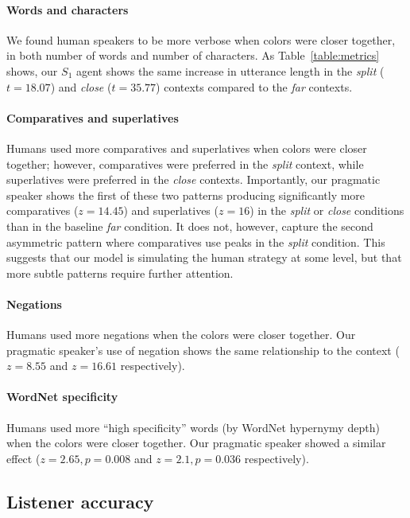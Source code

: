 \documentclass[11pt,letterpaper]{article}
\newcommand{\Speaker}{S}
\renewcommand{\|}{\mid}
\newcommand{\tabref}[1]{Table~\ref{#1}}
\newcommand{\cond}{\emph}
\begin{document}
\paragraph{Words and characters} We found human speakers to be more verbose when
colors were closer together, in both number of words and number of characters.
As \tabref{table:metrics} shows, our $\Speaker_{1}$  agent
shows the same increase in utterance length in the \cond{split} ($t = 18.07$) and \cond{close} ($t = 35.77$) contexts compared to the \cond{far} contexts.

\paragraph{Comparatives and superlatives} Humans used more comparatives and
superlatives when colors were closer together; however, comparatives were
preferred in the  \cond{split} context, while superlatives were preferred in
the \cond{close}
 contexts. Importantly, our pragmatic speaker shows the first of these two patterns
producing significantly more comparatives ($z = 14.45$) and superlatives ($z = 16$) in the \cond{split} or \cond{close} conditions than in the baseline \cond{far} condition. It does not, however, capture the second asymmetric pattern where comparatives use peaks in the \emph{split} condition. This suggests that our model is simulating the human strategy at some level, but that more subtle patterns require further attention.

\paragraph{Negations} Humans used more negations when the colors were closer
together. Our pragmatic speaker's use of negation shows the  same relationship to the context ($z = 8.55$ and $z= 16.61$ respectively).

\paragraph{WordNet specificity} Humans used more ``high specificity'' words
(by WordNet hypernymy depth) when the colors were closer together.
Our pragmatic speaker showed a similar effect ($z = 2.65, p =0.008$ and
$z = 2.1, p =0.036$ respectively).

\subsection{Listener accuracy}
\end{document}
